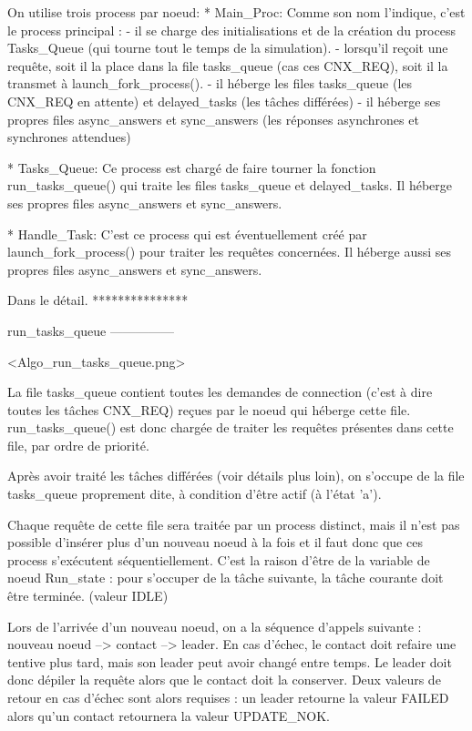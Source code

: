 On utilise trois process par noeud:
    * Main_Proc:
      Comme son nom l'indique, c'est le process principal :
        - il se charge des initialisations et de la création du process Tasks_Queue (qui tourne tout le temps de la simulation).
        - lorsqu'il reçoit une requête, soit il la place dans la file tasks_queue (cas ces CNX_REQ), soit il la transmet à
          launch_fork_process().
        - il héberge les files tasks_queue (les CNX_REQ en attente) et delayed_tasks (les tâches différées)
        - il héberge ses propres files async_answers et sync_answers (les réponses asynchrones et synchrones attendues)

    * Tasks_Queue:
      Ce process est chargé de faire tourner la fonction run_tasks_queue() qui traite les files tasks_queue et
      delayed_tasks.
      Il héberge ses propres files async_answers et sync_answers.

    * Handle_Task:
      C'est ce process qui est éventuellement créé par launch_fork_process() pour traiter les requêtes concernées.
      Il héberge aussi ses propres files async_answers et sync_answers.

Dans le détail.
***************

run_tasks_queue
---------------

<Algo_run_tasks_queue.png>

La file tasks_queue contient toutes les demandes de connection (c'est à dire toutes les tâches CNX_REQ) reçues par le
noeud qui héberge cette file. run_tasks_queue() est donc chargée de traiter les requêtes présentes dans cette file, par ordre de
priorité.

Après avoir traité les tâches différées (voir détails plus loin), on s'occupe de la file tasks_queue proprement dite, à
condition d'être actif (à l'état 'a').

Chaque requête de cette file sera traitée par un process distinct, mais il n'est pas possible d'insérer plus d'un
nouveau noeud à la fois et il faut donc que ces process s'exécutent séquentiellement. C'est la raison d'être de la
variable de noeud Run_state : pour s'occuper de la tâche suivante, la tâche courante doit être terminée. (valeur IDLE)

Lors de l'arrivée d'un nouveau noeud, on a la séquence d'appels suivante : nouveau noeud --> contact --> leader. En cas
d'échec, le contact doit refaire une tentive plus tard, mais son leader peut avoir changé entre temps. Le leader doit
donc dépiler la requête alors que le contact doit la conserver. Deux valeurs de retour en cas d'échec sont alors
requises : un leader retourne la valeur FAILED alors qu'un contact retournera la valeur UPDATE_NOK.

